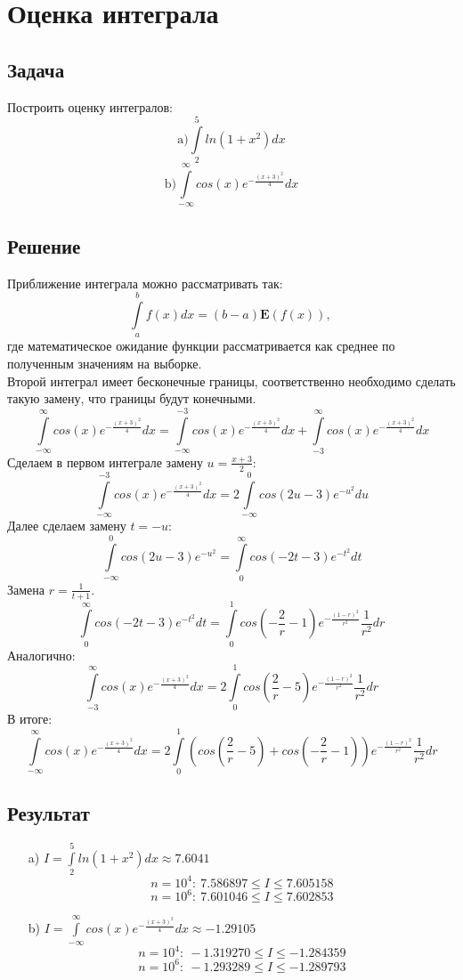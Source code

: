 \documentclass[fleqn, 10pt]{article}
\begin{document}
\section{Оценка интеграла}
\subsection{Задача}
Построить оценку интегралов:
\[\text{a)} \int\limits_{2}^{5}{ln(1+x^2)dx}\]
\[\text{b)} \int\limits_{-\infty}^{\infty}{cos(x)e^{-\frac{(x+3)^2}{4}}dx}\]
\subsection{Решение}
Приближение интеграла можно рассматривать так:
\[\int\limits_{a}^{b}{f(x)dx} = (b - a)\textbf{E}(f(x))\text{, }\]
где математическое ожидание функции рассматривается как среднее по полученным значениям на выборке.\\
Второй интеграл имеет бесконечные границы, соответственно необходимо сделать такую замену, что границы будут конечными.
\[\int\limits_{-\infty}^{\infty}{cos(x)e^{-\frac{(x+3)^2}{4}}dx} = \int\limits_{-\infty}^{-3}{cos(x)e^{-\frac{(x+3)^2}{4}}dx} + \int\limits_{-3}^{\infty}{cos(x)e^{-\frac{(x+3)^2}{4}}dx}\]
Сделаем в первом интеграле замену \(u = \frac{x+3}{2}\):
\[\int\limits_{-\infty}^{-3}{cos(x)e^{-\frac{(x+3)^2}{4}}dx} = 2\int\limits_{-\infty}^0{cos(2u-3)e^{-u^2}du}\]
Далее сделаем замену \(t = -u\):
\[\int\limits_{-\infty}^0{cos(2u-3)e^{-u^2}} = \int\limits_{0}^{\infty}{cos(-2t-3)e^{-t^2}}dt\]
Замена \(r = \frac{1}{t+1}\).
\[\int\limits_{0}^{\infty}{cos(-2t-3)e^{-t^2}dt} = \int\limits_{0}^{1}{cos(-\frac{2}{r}-1)e^{-\frac{(1-r)^2}{r^2}}\frac{1}{r^2}dr}\]
Аналогично:
\[\int\limits_{-3}^{\infty}{cos(x)e^{-\frac{(x+3)^2}{4}}dx} = 2\int\limits_{0}^{1}{cos(\frac{2}{r}-5)e^{-\frac{(1-r)^2}{r^2}}\frac{1}{r^2}dr}\]
В итоге:
\[\int\limits_{-\infty}^{\infty}{cos(x)e^{-\frac{(x+3)^2}{4}}dx} = 2\int\limits_{0}^{1}{(cos(\frac{2}{r}-5) + cos(-\frac{2}{r}-1))e^{-\frac{(1-r)^2}{r^2}}\frac{1}{r^2}dr}\]
\subsection{Результат}
\begin{itemize}
\item[a)] \(I = \int\limits_{2}^{5}{ln(1+x^2)dx} \approx 7.6041\)
\[n=10^4: \ 7.586897 \leq I \leq 7.605158\]
\[n=10^6: \ 7.601046 \leq I \leq 7.602853\]
\item[b)] \(I = \int\limits_{-\infty}^{\infty}{cos(x)e^{-\frac{(x+3)^2}{4}}dx}\approx -1.29105\)
\[n=10^4: \ -1.319270 \leq I \leq -1.284359 \]
\[n=10^6: \ -1.293289 \leq I \leq -1.289793\]
\end{itemize}
\end{document}
